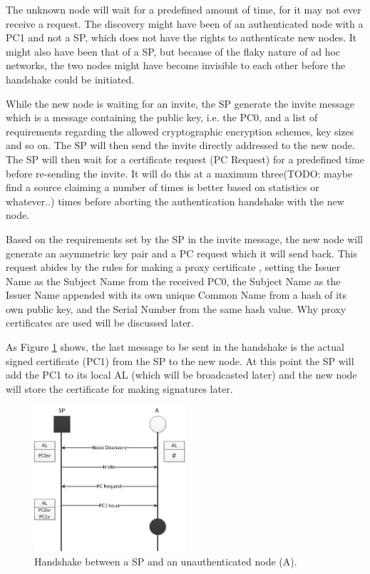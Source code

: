 The unknown node will wait for a predefined amount of time, for it may not ever
receive a request. The discovery might have been of an authenticated node with a
\ac{PC1} and not a \ac{SP}, which does not have the rights to authenticate new
nodes. It might also have been that of a \ac{SP}, but because of the flaky
nature of ad hoc networks, the two nodes might have become invisible to each
other before the handshake could be initiated.

While the new node is waiting for an invite, the \ac{SP} generate the invite
message which is a message containing the public key, i.e. the \ac{PC0}, and a
list of requirements regarding the allowed cryptographic encryption schemes, key
sizes and so on. The \ac{SP} will then send the invite directly addressed to the
new node. The \ac{SP} will then wait for a certificate request (\ac{PC} Request)
for a predefined time before re-sending the invite. It will do this at a maximum
three(TODO: maybe find a source claiming a number of times is better based on
statistics or whatever..) times before aborting the authentication handshake
with the new node.

Based on the requirements set by the \ac{SP} in the invite message, the new node
will generate an asymmetric key pair and a \ac{PC} request which it will send
back. This request abides by the rules for making a proxy certificate
\cite{rfc3820}, setting the Issuer Name as the Subject Name from the received
\ac{PC0}, the Subject Name as the Issuer Name appended with its own unique
Common Name from a hash of its own public key, and the Serial Number from the
same hash value. Why proxy certificates are used will be discussed later.

As Figure \ref{fig:node_states_handshake} shows, the last message to be sent in
the handshake is the actual signed certificate (\ac{PC1}) from the \ac{SP} to
the new node. At this point the \ac{SP} will add the \ac{PC1} to its local
\ac{AL} (which will be broadcasted later) and the new node will store the
certificate for making signatures later.

\begin{figure}[h]
	\centering
  	\includegraphics[width=0.5\textwidth]{images/node_states_handshake.png}
  	\caption{Handshake between a \acf{SP} and an unauthenticated node (A).}
	\label{fig:node_states_handshake}
\end{figure}

